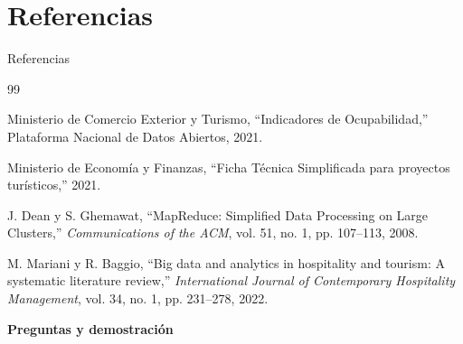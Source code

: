 \documentclass{beamer}
\begin{document}
\section{Referencias}

\begin{frame}[allowframebreaks]{Referencias}
\footnotesize
\begin{thebibliography}{99}

Ministerio de Comercio Exterior y Turismo,
``Indicadores de Ocupabilidad,''
Plataforma Nacional de Datos Abiertos, 2021.

Ministerio de Economía y Finanzas,
``Ficha Técnica Simplificada para proyectos turísticos,''
2021.

J. Dean y S. Ghemawat,
``MapReduce: Simplified Data Processing on Large Clusters,''
\textit{Communications of the ACM},
vol. 51, no. 1, pp. 107--113, 2008.

M. Mariani y R. Baggio,
``Big data and analytics in hospitality and tourism:
A systematic literature review,''
\textit{International Journal of Contemporary Hospitality Management},
vol. 34, no. 1, pp. 231--278, 2022.

\end{thebibliography}

\vfill
\centering
\Large\textbf{Preguntas y demostración}

\end{frame}
\end{document}
